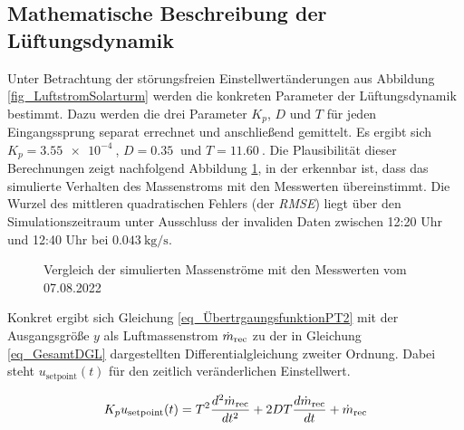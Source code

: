 \subsection{Mathematische Beschreibung der Lüftungsdynamik} \label{subsec_BeschreibungLüftungsDyn}
Unter Betrachtung der störungsfreien Einstellwertänderungen aus Abbildung \ref{fig_LuftstromSolarturm} werden die konkreten Parameter der Lüftungsdynamik bestimmt.
Dazu werden die drei Parameter $K_p$, $D$ und $T$ für jeden Eingangssprung separat errechnet und anschließend gemittelt.
Es ergibt sich \linebreak$K_p = \SI{3.55e-4}{}$, $D = \SI{0.35}{}$ und $T = \SI{11.60}{}$.
Die Plausibilität dieser Berechnungen zeigt nachfolgend Abbildung \ref{fig_LuftstromplusSimulativ}, in der erkennbar ist, dass das simulierte Verhalten des Massenstroms mit den Messwerten übereinstimmt.
Die Wurzel des mittleren quadratischen Fehlers (der \textit{RMSE}) liegt über den Simulationszeitraum unter Ausschluss der invaliden Daten zwischen 12:20 Uhr und 12:40 Uhr bei $\SI{0.043}{\kilo\gram\per\second}$.

\begin{figure}[h!]
    \centering
    \setlength{\fboxsep}{1pt}
    \setlength{\fboxrule}{1pt}
    \caption[Vergleich der simulierten Massenströme mit den Messwerten vom 07.08.2022]{Vergleich der simulierten Massenströme mit den Messwerten vom 07.08.2022}
    \label{fig_LuftstromplusSimulativ}
\end{figure}

Konkret ergibt sich Gleichung \ref{eq_ÜbertrgaungsfunktionPT2} mit der Ausgangsgröße $y$ als Luftmassenstrom $\dot{m}_{\mathrm{rec}}$ zu der in Gleichung \ref{eq_GesamtDGL} dargestellten Differentialgleichung zweiter Ordnung.
Dabei steht $u_{\mathrm{setpoint}}(t)$ für den zeitlich veränderlichen Einstellwert.

\begin{equation} \label{eq_GesamtDGL}
K_p u_{\mathrm{setpoint}}(t) = T^2 \frac{d^2\dot{m}_{\mathrm{rec}}}{dt^2} + 2 D T \frac{d\dot{m}_{\mathrm{rec}}}{dt} + \dot{m}_{\mathrm{rec}}
\end{equation}

